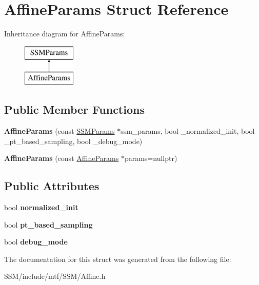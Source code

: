 \hypertarget{structAffineParams}{\section{Affine\-Params Struct Reference}
\label{structAffineParams}
}
Inheritance diagram for Affine\-Params\-:\begin{figure}[H]
\begin{center}
\leavevmode
\includegraphics[height=2.000000cm]{structAffineParams}
\end{center}
\end{figure}
\subsection*{Public Member Functions}
\begin{DoxyCompactItemize}
\item 
\hypertarget{structAffineParams_a17bcd5f9b67039b290e21a50b9a62947}{{\bfseries Affine\-Params} (const \hyperlink{structSSMParams}{S\-S\-M\-Params} $\ast$ssm\-\_\-params, bool \-\_\-normalized\-\_\-init, bool \-\_\-pt\-\_\-based\-\_\-sampling, bool \-\_\-debug\-\_\-mode)}\label{structAffineParams_a17bcd5f9b67039b290e21a50b9a62947}

\item 
\hypertarget{structAffineParams_ae0985577e304c177588007ac80e6c353}{{\bfseries Affine\-Params} (const \hyperlink{structAffineParams}{Affine\-Params} $\ast$params=nullptr)}\label{structAffineParams_ae0985577e304c177588007ac80e6c353}

\end{DoxyCompactItemize}
\subsection*{Public Attributes}
\begin{DoxyCompactItemize}
\item 
\hypertarget{structAffineParams_ab4c42aa3f2270811a6d3663ba445e9c9}{bool {\bfseries normalized\-\_\-init}}\label{structAffineParams_ab4c42aa3f2270811a6d3663ba445e9c9}

\item 
\hypertarget{structAffineParams_ab2c63e280584f9e50666b0b18865f78b}{bool {\bfseries pt\-\_\-based\-\_\-sampling}}\label{structAffineParams_ab2c63e280584f9e50666b0b18865f78b}

\item 
\hypertarget{structAffineParams_a580684e98999b8a2fee6de66290abb1a}{bool {\bfseries debug\-\_\-mode}}\label{structAffineParams_a580684e98999b8a2fee6de66290abb1a}

\end{DoxyCompactItemize}


The documentation for this struct was generated from the following file\-:\begin{DoxyCompactItemize}
\item 
S\-S\-M/include/mtf/\-S\-S\-M/Affine.\-h\end{DoxyCompactItemize}
